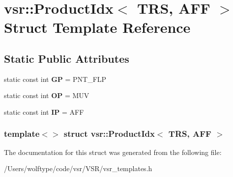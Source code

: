 \hypertarget{structvsr_1_1_product_idx_3_01_t_r_s_00_01_a_f_f_01_4}{\section{vsr\-:\-:Product\-Idx$<$ T\-R\-S, A\-F\-F $>$ Struct Template Reference}
\label{structvsr_1_1_product_idx_3_01_t_r_s_00_01_a_f_f_01_4}
}
\subsection*{Static Public Attributes}
\begin{DoxyCompactItemize}
\item 
\hypertarget{structvsr_1_1_product_idx_3_01_t_r_s_00_01_a_f_f_01_4_a9fcca98d9db10047e174b1a69e9f3f8a}{static const int {\bfseries G\-P} = P\-N\-T\-\_\-\-F\-L\-P}\label{structvsr_1_1_product_idx_3_01_t_r_s_00_01_a_f_f_01_4_a9fcca98d9db10047e174b1a69e9f3f8a}

\item 
\hypertarget{structvsr_1_1_product_idx_3_01_t_r_s_00_01_a_f_f_01_4_a40e1fde80b252a0ab28a5a59ddb9fc35}{static const int {\bfseries O\-P} = M\-U\-V}\label{structvsr_1_1_product_idx_3_01_t_r_s_00_01_a_f_f_01_4_a40e1fde80b252a0ab28a5a59ddb9fc35}

\item 
\hypertarget{structvsr_1_1_product_idx_3_01_t_r_s_00_01_a_f_f_01_4_af004981fc1648073c3f82c666384ba18}{static const int {\bfseries I\-P} = A\-F\-F}\label{structvsr_1_1_product_idx_3_01_t_r_s_00_01_a_f_f_01_4_af004981fc1648073c3f82c666384ba18}

\end{DoxyCompactItemize}
\subsubsection*{template$<$$>$ struct vsr\-::\-Product\-Idx$<$ T\-R\-S, A\-F\-F $>$}



The documentation for this struct was generated from the following file\-:\begin{DoxyCompactItemize}
\item 
/\-Users/wolftype/code/vsr/\-V\-S\-R/vsr\-\_\-templates.\-h\end{DoxyCompactItemize}
